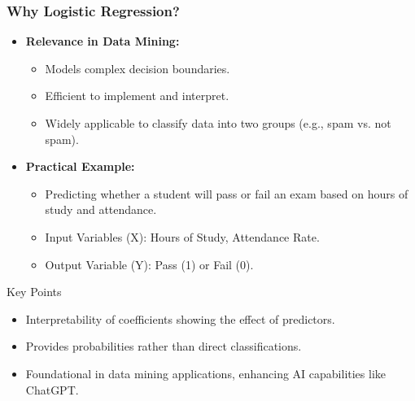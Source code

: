 \documentclass[aspectratio=169]{beamer}
\begin{document}
\begin{frame}[fragile]
    \frametitle{Why Logistic Regression?}
    \begin{itemize}
        \item \textbf{Relevance in Data Mining:}
        \begin{itemize}
            \item Models complex decision boundaries.
            \item Efficient to implement and interpret.
            \item Widely applicable to classify data into two groups (e.g., spam vs. not spam).
        \end{itemize}
        \item \textbf{Practical Example:}
        \begin{itemize}
            \item Predicting whether a student will pass or fail an exam based on hours of study and attendance.
            \item Input Variables (X): Hours of Study, Attendance Rate.
            \item Output Variable (Y): Pass (1) or Fail (0).
        \end{itemize}
    \end{itemize}
    
    \begin{block}{Key Points}
        \begin{itemize}
            \item Interpretability of coefficients showing the effect of predictors.
            \item Provides probabilities rather than direct classifications.
            \item Foundational in data mining applications, enhancing AI capabilities like ChatGPT.
        \end{itemize}
    \end{block}
\end{frame}
\end{document}
